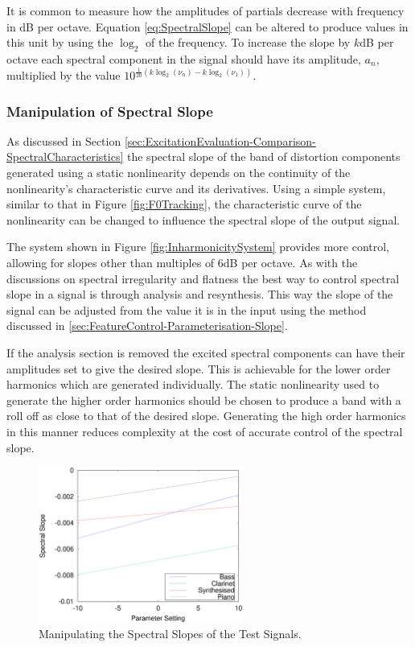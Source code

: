 		It is common to measure how the amplitudes of partials decrease with frequency in dB per octave. Equation
		\ref{eq:SpectralSlope} can be altered to produce values in this unit by using the $\log_{2}$ of the
		frequency. To increase the slope by $k$dB per octave each spectral component in the signal should have its
		amplitude, $a_{n}$, multiplied by the value $10^{\frac{1}{20}(k\log_{2}(\nu_{n}) - k\log_{2}(\nu_{1}))}$.

		\subsubsection*{Manipulation of Spectral Slope}
			As discussed in Section \ref{sec:ExcitationEvaluation-Comparison-SpectralCharacteristics} the
			spectral slope of the band of distortion components generated using a static nonlinearity depends
			on the continuity of the nonlinearity's characteristic curve and its derivatives. Using a simple
			system, similar to that in Figure \ref{fig:F0Tracking}, the characteristic curve of the
			nonlinearity can be changed to influence the spectral slope of the output signal.

			The system shown in Figure \ref{fig:InharmonicitySystem} provides more control, allowing for slopes
			other than multiples of 6dB per octave. As with the discussions on spectral irregularity and
			flatness the best way to control spectral slope in a signal is through analysis and resynthesis.
			This way the slope of the signal can be adjusted from the value it is in the input using the method
			discussed in \ref{sec:FeatureControl-Parameterisation-Slope}.
			
			If the analysis section is removed the excited spectral components can have their amplitudes set to
			give the desired slope. This is achievable for the lower order harmonics which are generated
			individually.  The static nonlinearity used to generate the higher order harmonics should be chosen
			to produce a band with a roll off as close to that of the desired slope. Generating the high order
			harmonics in this manner reduces complexity at the cost of accurate control of the spectral slope.

			\begin{figure}[h!]
				\centering
				\includegraphics[width=0.6\textwidth]{chapter6/Images/MoveSlopes.eps}
				\caption{Manipulating the Spectral Slopes of the Test Signals.}
				\label{fig:MoveSlopes}
			\end{figure}

